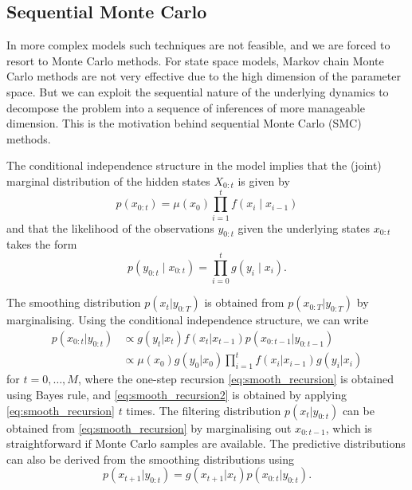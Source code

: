 \documentclass[fleqn]{article}
\begin{document}
\subsection{Sequential Monte Carlo}
In more complex models such techniques are not feasible, and we are forced to resort to Monte Carlo methods.
For state space models, Markov chain Monte Carlo methods are not very effective due to the high dimension of the parameter space. But we can exploit the sequential nature of the underlying dynamics to decompose the problem into a sequence of inferences of more manageable dimension.
This is the motivation behind sequential Monte Carlo (SMC) methods.

The conditional independence structure in the model implies that the (joint) marginal distribution of the hidden states $X_{0:t}$ is given by
\begin{equation*} \label{eq:hmm_marginal}
p(x_{0:t}) = \mu(x_0) \prod_{i=1}^t f(x_i \mid x_{i-1})
\end{equation*}
and that the likelihood of the observations $y_{0:t}$ given the underlying states $x_{0:t}$ takes the form
\begin{equation*} \label{eq:hmm_likelihood}
p(y_{0:t} \mid x_{0:t}) = \prod_{i=0}^t g(y_i \mid x_i).
\end{equation*}

The smoothing distribution $p(x_{t} | y_{0:T})$ is obtained from $p(x_{0:T} | y_{0:T})$ by marginalising. Using the conditional independence structure, we can write
\begin{align}
p(x_{0:t} | y_{0:t}) &\propto g(y_t | x_t) f(x_t | x_{t-1}) p(x_{0:t-1} | y_{0:t-1}) \label{eq:smooth_recursion}\\
&\propto \mu(x_0) g(y_0 | x_0) \prod_{i=1}^t f(x_i | x_{i-1}) g(y_i | x_i) \label{eq:smooth_recursion2}
\end{align}
for $t = 0,\dots,M$, where the one-step recursion \eqref{eq:smooth_recursion} is obtained using Bayes rule, and \eqref{eq:smooth_recursion2} is obtained by applying \eqref{eq:smooth_recursion} $t$ times. 
The filtering distribution $p(x_t | y_{0:t})$ can be obtained from \eqref{eq:smooth_recursion} by marginalising out $x_{0:t-1}$, which is straightforward if Monte Carlo samples are available.
The predictive distributions can also be derived from the smoothing distributions using
\begin{equation*}
p(x_{t+1} | y_{0:t}) = g(x_{t+1} | x_t) p(x_{0:t} | y_{0:t}).
\end{equation*}
\end{document}
